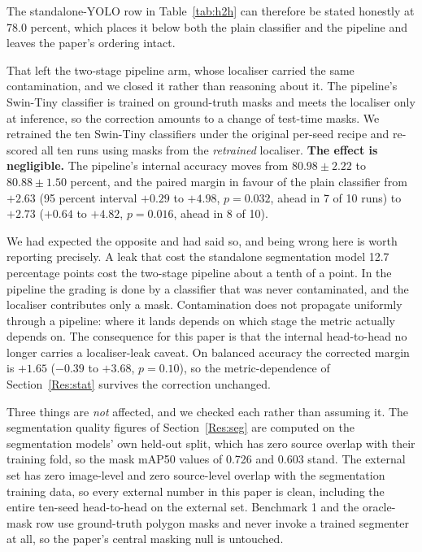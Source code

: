 \documentclass{melba}
\begin{document}
The standalone-YOLO row in Table~\ref{tab:h2h} can therefore be stated honestly at 78.0 percent, which places it below both the plain classifier and the pipeline and leaves the paper's ordering intact.

That left the two-stage pipeline arm, whose localiser carried the same contamination, and we closed it rather than reasoning about it. The pipeline's Swin-Tiny classifier is trained on ground-truth masks and meets the localiser only at inference, so the correction amounts to a change of test-time masks. We retrained the ten Swin-Tiny classifiers under the original per-seed recipe and re-scored all ten runs using masks from the \emph{retrained} localiser. \textbf{The effect is negligible.} The pipeline's internal accuracy moves from $80.98 \pm 2.22$ to $80.88 \pm 1.50$ percent, and the paired margin in favour of the plain classifier from $+2.63$ (95 percent interval $+0.29$ to $+4.98$, $p=0.032$, ahead in 7 of 10 runs) to $+2.73$ ($+0.64$ to $+4.82$, $p=0.016$, ahead in 8 of 10).

We had expected the opposite and had said so, and being wrong here is worth reporting precisely. A leak that cost the standalone segmentation model 12.7 percentage points cost the two-stage pipeline about a tenth of a point. In the pipeline the grading is done by a classifier that was never contaminated, and the localiser contributes only a mask. Contamination does not propagate uniformly through a pipeline: where it lands depends on which stage the metric actually depends on. The consequence for this paper is that the internal head-to-head no longer carries a localiser-leak caveat. On balanced accuracy the corrected margin is $+1.65$ ($-0.39$ to $+3.68$, $p=0.10$), so the metric-dependence of Section~\ref{Res:stat} survives the correction unchanged.

Three things are \emph{not} affected, and we checked each rather than assuming it. The segmentation quality figures of Section~\ref{Res:seg} are computed on the segmentation models' own held-out split, which has zero source overlap with their training fold, so the mask mAP50 values of 0.726 and 0.603 stand. The external set has zero image-level and zero source-level overlap with the segmentation training data, so every external number in this paper is clean, including the entire ten-seed head-to-head on the external set. Benchmark 1 and the oracle-mask row use ground-truth polygon masks and never invoke a trained segmenter at all, so the paper's central masking null is untouched.
\end{document}
